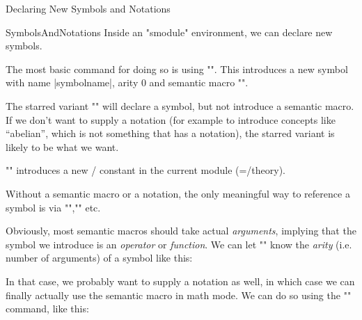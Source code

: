 \begin{sfragment}{Declaring New Symbols and Notations}
\begin{smodule}[ns=https://github.com/slatex/sTeX/doc]{SymbolsAndNotations}
    Inside an \stexcode"smodule" environment, we can declare new
    \sTeX symbols.

    \begin{function}{\symdecl}
        The most basic command for doing so is using
        \stexcode"". This introduces
        a new symbol with name |symbolname|, arity $0$ and 
        semantic macro \stexcode"\symbolname".

        The starred variant \stexcode"" will
        declare a symbol, but not introduce a semantic macro.
        If we don't want to supply a notation (for example to introduce
        concepts like ``abelian'', which is not something that
        has a notation), the starred variant is likely to be what we
        want.
    \end{function}
    \begin{mmtbox}
        \stexcode"\symdecl" introduces a new \omdoc/\mmt
        constant in the current module (=\omdoc/\mmt theory).
    \end{mmtbox}

    Without a semantic macro or a notation, the only 
    meaningful way to reference a symbol
    is via \stexcode"\symref",\stexcode"\symname" etc.


    Obviously, most semantic macros should take actual \emph{arguments},
    implying that the symbol we introduce is an \emph{operator} or
    \emph{function}. We can let \stexcode"\symdecl" know the
    \emph{arity} (i.e. number of arguments) of a symbol like this:


    \begin{function}{\notation}
        In that case, we probably want to supply a notation as well,
        in which case we can finally actually use 
        the semantic macro in math mode.
        We can do so using the \stexcode"\notation" command, like this:
    \end{function}


\end{smodule}
\end{sfragment}
